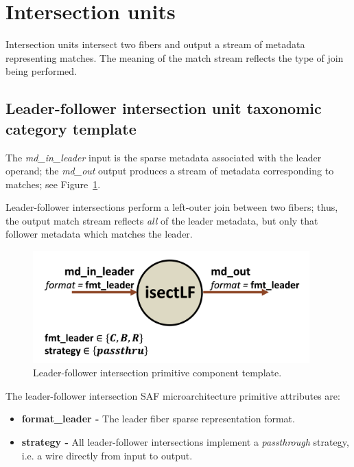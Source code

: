 \section{Intersection units}

Intersection units intersect two fibers and output a stream of metadata representing matches. The meaning of the match stream reflects the type of join being performed.

\subsection{Leader-follower intersection unit taxonomic category template}

The \textit{md\_in\_leader} input is the sparse metadata associated with the leader operand; the \textit{md\_out} output produces a stream of metadata corresponding to matches; see Figure~\ref{fig:isectlf}.

Leader-follower intersections perform a left-outer join between two fibers; thus, the output match stream reflects \textit{all} of the leader metadata, but only that follower metadata which matches the leader.

\begin{figure}[H]
    \centering
    \includegraphics[width=0.95\textwidth]{figures/isectlf.png}
    \caption{Leader-follower intersection primitive component template.}
    \label{fig:isectlf}
\end{figure}

The leader-follower intersection SAF microarchitecture primitive attributes are:

\begin{itemize}
    \item \textbf{format\_leader -} The leader fiber sparse representation format.
    \item \textbf{strategy -} All leader-follower intersections implement a \textit{passthrough} strategy, i.e. a wire directly from input to output.
\end{itemize}

